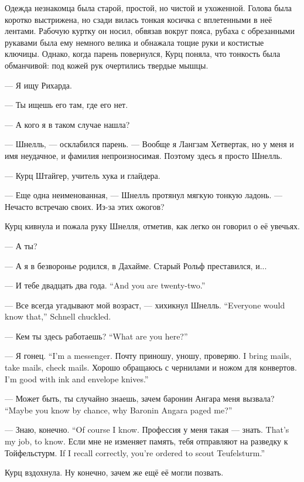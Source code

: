 Одежда незнакомца была старой, простой, но чистой и ухоженной.
Голова была коротко выстрижена, но сзади вилась тонкая косичка с вплетенными в неё лентами.
Рабочую куртку он носил, обвязав вокруг пояса, рубаха с обрезанными рукавами была ему немного велика и обнажала тощие руки и костистые ключицы.
Однако, когда парень повернулся, Курц поняла, что тонкость была обманчивой: под кожей рук очертились твердые мышцы.

--- Я ищу Рихарда.

--- Ты ищешь его там, где его нет.

--- А кого я в таком случае нашла?

--- Шнелль, --- осклабился парень.
--- Вообще я Лангзам Хетвертак, но у меня и имя неудачное, и фамилия непроизносимая.
Поэтому здесь я просто Шнелль.

--- Курц Штайгер, учитель хука и глайдера.

--- Еще одна неименованная, --- Шнелль протянул мягкую тонкую ладонь.
--- Нечасто встречаю своих.
Из-за этих ожогов?

Курц кивнула и пожала руку Шнелля, отметив, как легко он говорил о её увечьях.

--- А ты?

--- А я в безворонье родился, в Дахайме.
Старый Рольф преставился, и...

{--- И тебе двадцать два года.}
{``And you are twenty-two.''}

{--- Все всегда угадывают мой возраст, --- хихикнул Шнелль.}
{``Everyone would know that,'' Schnell chuckled.}

{--- Кем ты здесь работаешь?}
{``What are you here?''}

{--- Я гонец.}
{``I'm a messenger.}
{Почту приношу, уношу, проверяю.}
{I bring mails, take mails, check mails.}
{Хорошо обращаюсь с чернилами и ножом для конвертов.}
{I'm good with ink and envelope knives.''}

{--- Может быть, ты случайно знаешь, зачем баронин Ангара меня вызвала?}
{``Maybe you know by chance, why Baronin Angara paged me?''}

{--- Знаю, конечно.}
{``Of course I know.}
{Профессия у меня такая --- знать.}
{That's my job, to know.}
{Если мне не изменяет память, тебя отправляют на разведку к Тойфельстурм.}
{If I recall correctly, you're ordered to scout Teufelsturm.''}

Курц вздохнула.
Ну конечно, зачем же ещё её могли позвать.


